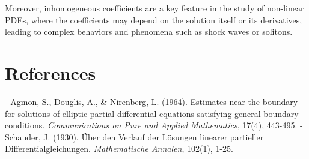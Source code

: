 \documentclass[11pt,a4paper]{article}
\begin{document}
Moreover, inhomogeneous coefficients are a key feature in the study of non-linear PDEs, where the coefficients may depend on the solution itself or its derivatives, leading to complex behaviors and phenomena such as shock waves or solitons.

\section{References}
- Agmon, S., Douglis, A., & Nirenberg, L. (1964). Estimates near the boundary for solutions of elliptic partial differential equations satisfying general boundary conditions. \textit{Communications on Pure and Applied Mathematics}, 17(4), 443-495.
- Schauder, J. (1930). Über den Verlauf der Lösungen linearer partieller Differentialgleichungen. \textit{Mathematische Annalen}, 102(1), 1-25.
\end{document}

